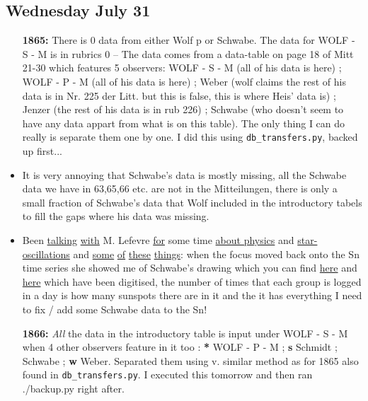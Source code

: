 \documentclass[12pt]{article}
\begin{document}
\subsection{Wednesday July 31}
\begin{itemize}
    \item[\textbf{1865:}] There is 0 data from either Wolf p or Schwabe. The data for WOLF - S - M is in rubrics 0 -- The data comes from a data-table on page 18 of Mitt 21-30 which features 5 observers: WOLF - S - M (all of his data is here) ; WOLF - P - M (all of his data is here) ; Weber (wolf claims the rest of his data is in Nr. 225 der Litt. but this is false, this is where Heis' data is) ; Jenzer (the rest of his data is in rub 226) ; Schwabe (who doesn't seem to have any data appart from what is on this table). The only thing I can do really is separate them one by one. I did this using \texttt{db\_transfers.py}, backed up first...
    \item It is very annoying that Schwabe's data is mostly missing, all the Schwabe data we have in 63,65,66 etc. are not in the Mitteilungen, there is only a small fraction of Schwabe's data that Wolf included in the introductory tabels to fill the gaps where his data was missing. 
    \item Been \href{https://www.britannica.com/science/accretion-disk}{talking} \href{https://en.wikipedia.org/wiki/Black_body}{with} M. Lefevre \href{https://en.wikipedia.org/wiki/WR_137#/media/File:Wr137_spc.png}{for} some time \href{https://en.wikipedia.org/wiki/WR_124}{about physics} and \href{https://iopscience.iop.org/article/10.1086/498393/pdf}{star-oscillations} and \href{https://en.wikipedia.org/wiki/Blue_giant}{some} \href{https://en.wikipedia.org/wiki/Fortran}{of} \href{https://www.euclid-ec.org/}{these} \href{http://www.stsci.edu/hst/stis/documents/isrs/2015_03.pdf}{things}: when the focus moved back onto the Sn time series she showed me of Schwabe's drawing which you can find \href{https://www.aip.de/Members/rarlt/sunspots/schwabe/paper-schwabe-data}{here} and \href{https://www.aip.de/Members/rarlt/sunspots/schwabe}{here} which have been digitised, the number of times that each group is logged in a day is how many sunspots there are in it and the it has everything I need to fix / add some Schwabe data to the Sn!
    
    \item[\textbf{1866:}] \textit{All} the data in the introductory table is input under WOLF - S - M when 4 other observers feature in it too : \textbf{*} WOLF - P - M ; \textbf{s} Schmidt ; \textbf{\dag} Schwabe ; \textbf{w} Weber. Separated them using v. similar method as for 1865 also found in \texttt{db\_transfers.py}. I executed this tomorrow and then ran ./backup.py right after.
\end{itemize}
\end{document}
